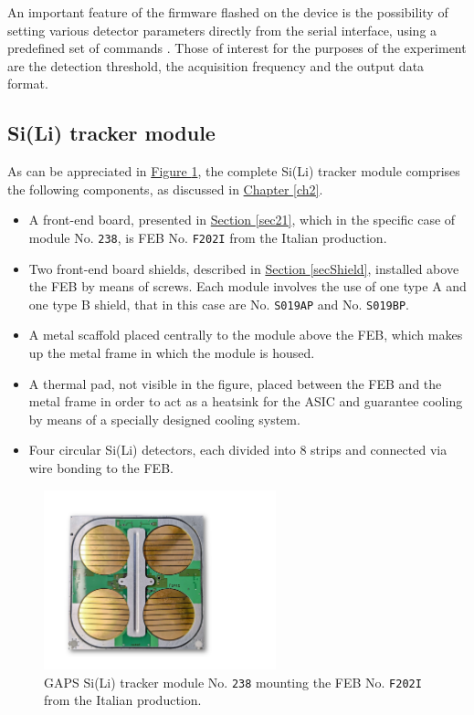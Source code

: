 \par
An important feature of the firmware flashed on the device is the possibility of setting various detector parameters directly from the serial interface, using a predefined set of commands \cite{bocci_2022_ardusipm}. Those of interest for the purposes of the experiment are the detection threshold, the acquisition frequency and the output data format.


\subsection{Si(Li) tracker module}
\label{siliModule}
\par
As can be appreciated in \hyperref[figSILImodule]{Figure \ref{figSILImodule}}, the complete Si(Li) tracker module comprises the following components, as discussed in \hyperref[ch2]{Chapter \ref{ch2}}.

\begin{itemize}
    \itemsep0em
    \item A front-end board, presented in \hyperref[sec21]{Section \ref{sec21}}, which in the specific case of module No. \texttt{238}, is FEB No. \texttt{F202I} from the Italian production.
    \item Two front-end board shields, described in \hyperref[secShield]{Section \ref{secShield}}, installed above the FEB by means of screws. Each module involves the use of one type A and one type B shield, that in this case are No. \texttt{S019AP} and No. \texttt{S019BP}.
    \item A metal scaffold placed centrally to the module above the FEB, which makes up the metal frame in which the module is housed.
    \item A thermal pad, not visible in the figure, placed between the FEB and the metal frame in order to act as a heatsink for the ASIC and guarantee cooling by means of a specially designed cooling system.
    \item Four circular Si(Li) detectors, each divided into 8 strips and connected via wire bonding to the FEB.
\end{itemize}

\begin{figure}[h!]
    \centering
    \includegraphics[width=0.6\textwidth]{Images/chap3/GAPS_module.pdf}
    \caption{GAPS Si(Li) tracker module No. \texttt{238} mounting the FEB No. \texttt{F202I} from the Italian production.}
    \label{figSILImodule}
\end{figure}


